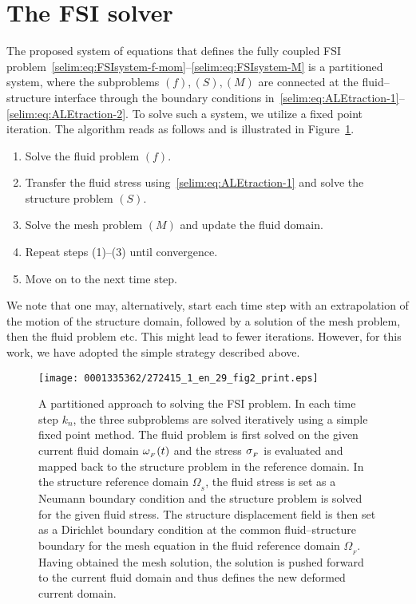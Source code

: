 \section{The FSI solver}
\label{selim:sec:primalsolver}

The proposed system of equations that defines the fully coupled FSI
problem~\eqref{selim:eq:FSIsystem-f-mom}--\eqref{selim:eq:FSIsystem-M} is a partitioned system, where the
subproblems $(f),(S),(M)$ are connected at the fluid--structure interface
through the boundary conditions in~\eqref{selim:eq:ALEtraction-1}--\eqref{selim:eq:ALEtraction-2}. To
solve such a system, we utilize a fixed point iteration. The algorithm
reads as follows and is illustrated in Figure~\ref{selim:fig:fp}.

\pagebreak

\begin{enumerate}
  \item Solve the fluid problem $(f)$.

  \item Transfer the fluid stress using~\eqref{selim:eq:ALEtraction-1}
  and solve the structure problem $(S)$.

  \item Solve the mesh problem $(M)$ and update the fluid domain.

  \item Repeat steps (1)--(3) until convergence.

  \item Move on to the next time step.
\end{enumerate}
We note that one may, alternatively, start each time step with an
extrapolation of the motion of the structure domain, followed by a
solution of the mesh problem, then the fluid problem etc. This might
lead to fewer iterations. However, for this work, we have adopted the
simple strategy described above.

\begin{figure}[!t]
  \centering
  \texttt{[image: 0001335362/272415\_1\_en\_29\_fig2\_print.eps]}
  \caption{A partitioned approach to solving the FSI problem. In each
    time step $k_n$, the three subproblems are solved iteratively
    using a simple fixed point method. The fluid problem is first
    solved on the given current fluid domain $\omega_{_{F}}(t)$ and the stress
    $\sigma_{_{F}}$ is evaluated and mapped back to the
    structure problem in the reference domain. In the structure
    reference domain $\Omega_{_{S}}$, the fluid stress is set as a
    Neumann boundary condition and the structure problem is solved for the
    given fluid stress. The structure displacement field is then set
    as a Dirichlet boundary condition at the common fluid--structure
    boundary for the mesh equation in the fluid reference domain
    $\Omega_{_{F}}$. Having obtained the mesh solution, the solution
    is pushed forward to the current fluid domain and thus defines the
    new deformed current domain.}\label{selim:fig:fp}
\end{figure}

